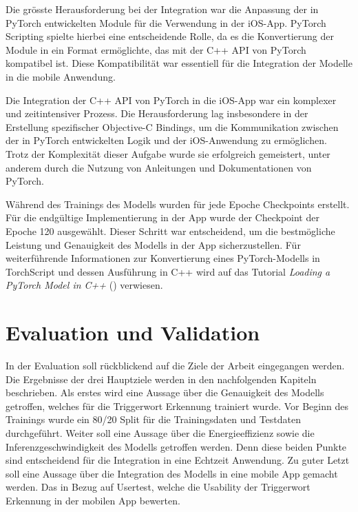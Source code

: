 \documentclass[11pt,a4paper]{article}
\begin{document}
\noindent \newline
Die grösste Herausforderung bei der Integration war die Anpassung der in PyTorch entwickelten Module 
für die Verwendung in der iOS-App. PyTorch Scripting spielte hierbei eine entscheidende Rolle, da 
es die Konvertierung der Module in ein Format ermöglichte, das mit der C++ API von PyTorch 
kompatibel ist. Diese Kompatibilität war essentiell für die Integration der Modelle in die mobile 
Anwendung.

\noindent \newline
Die Integration der C++ API von PyTorch in die iOS-App war ein komplexer und zeitintensiver Prozess. 
Die Herausforderung lag insbesondere in der Erstellung spezifischer Objective-C Bindings, um die 
Kommunikation zwischen der in PyTorch entwickelten Logik und der iOS-Anwendung zu ermöglichen. 
Trotz der Komplexität dieser Aufgabe wurde sie erfolgreich gemeistert, unter anderem durch die 
Nutzung von Anleitungen und Dokumentationen von PyTorch.

\noindent \newline
Während des Trainings des Modells wurden für jede Epoche Checkpoints erstellt. Für die endgültige 
Implementierung in der App wurde der Checkpoint der Epoche 120 ausgewählt. Dieser Schritt war 
entscheidend, um die bestmögliche Leistung und Genauigkeit des Modells in der App sicherzustellen. 
Für weiterführende Informationen zur Konvertierung eines PyTorch-Modells in TorchScript und dessen 
Ausführung in C++ wird auf das Tutorial \textit{Loading a PyTorch Model in C++} 
(\cite{pytorch2023jit}) verwiesen.


\newpage \section{Evaluation und Validation} \label{sec:evaluation}
In der Evaluation soll rückblickend auf die Ziele der Arbeit eingegangen werden. Die Ergebnisse der 
drei Hauptziele werden in den nachfolgenden Kapiteln beschrieben. Als erstes wird eine Aussage über 
die Genauigkeit des Modells getroffen, welches für die Triggerwort Erkennung trainiert wurde. Vor 
Beginn des Trainings wurde ein 80/20 Split für die Trainingsdaten und Testdaten durchgeführt. 
Weiter soll eine Aussage über die Energieeffizienz sowie die Inferenzgeschwindigkeit des Modells 
getroffen werden. Denn diese beiden Punkte sind entscheidend für die Integration in eine Echtzeit 
Anwendung. Zu guter Letzt soll eine Aussage über die Integration des Modells in eine mobile App 
gemacht werden. Das in Bezug auf Usertest, welche die Usability der Triggerwort Erkennung in der 
mobilen App bewerten.
\end{document}
